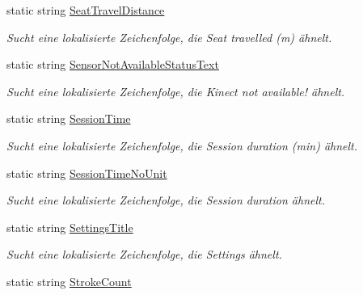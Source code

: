 \begin{DoxyCompactItemize}
static string \hyperlink{class_rowing_monitor_1_1_properties_1_1_resources_aca5c841d63ec2df9c33e4728c09fdf8f}{Seat\+Travel\+Distance}
\begin{DoxyCompactList}\small\item\em Sucht eine lokalisierte Zeichenfolge, die Seat travelled (m) ähnelt. \end{DoxyCompactList}\item 
static string \hyperlink{class_rowing_monitor_1_1_properties_1_1_resources_a9966b553e0fb646c78b9256ef6574b53}{Sensor\+Not\+Available\+Status\+Text}
\begin{DoxyCompactList}\small\item\em Sucht eine lokalisierte Zeichenfolge, die Kinect not available! ähnelt. \end{DoxyCompactList}\item 
static string \hyperlink{class_rowing_monitor_1_1_properties_1_1_resources_a0224e4993f61a965fcf0daadb31bfc97}{Session\+Time}
\begin{DoxyCompactList}\small\item\em Sucht eine lokalisierte Zeichenfolge, die Session duration (min) ähnelt. \end{DoxyCompactList}\item 
static string \hyperlink{class_rowing_monitor_1_1_properties_1_1_resources_ad4acf4d548be476b04c7d9a672159eb8}{Session\+Time\+No\+Unit}
\begin{DoxyCompactList}\small\item\em Sucht eine lokalisierte Zeichenfolge, die Session duration ähnelt. \end{DoxyCompactList}\item 
static string \hyperlink{class_rowing_monitor_1_1_properties_1_1_resources_a655e6b7c1b7acdb6fadf85cd16f3a419}{Settings\+Title}
\begin{DoxyCompactList}\small\item\em Sucht eine lokalisierte Zeichenfolge, die Settings ähnelt. \end{DoxyCompactList}\item 
static string \hyperlink{class_rowing_monitor_1_1_properties_1_1_resources_a09527fe0922f1b0c8ebfa2cb18864020}{Stroke\+Count}

\end{DoxyCompactItemize}
